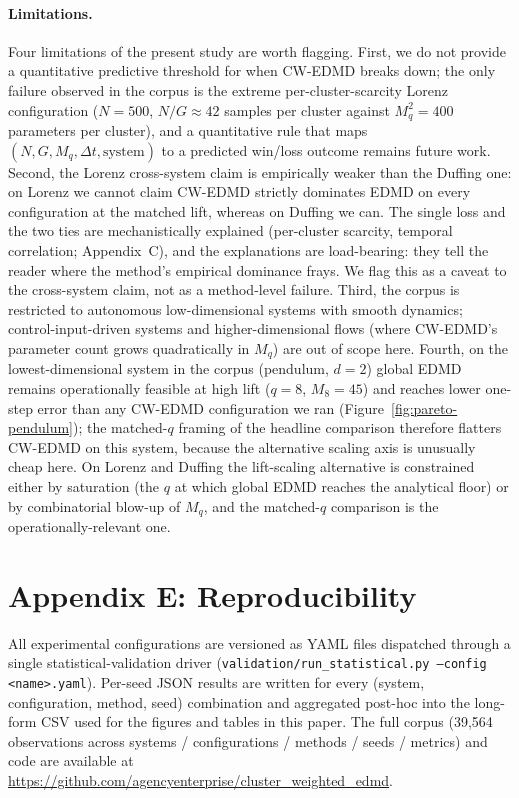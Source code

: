 \documentclass{article}
\begin{document}
\paragraph{Limitations.} Four limitations of the present study are worth flagging. First, we do not provide a quantitative predictive threshold for when CW-EDMD breaks down; the only failure observed in the corpus is the extreme per-cluster-scarcity Lorenz configuration ($N{=}500$, $N/G \approx 42$ samples per cluster against $M_q^2 = 400$ parameters per cluster), and a quantitative rule that maps $(N, G, M_q, \Delta t, \text{system})$ to a predicted win/loss outcome remains future work. Second, the Lorenz cross-system claim is empirically weaker than the Duffing one: on Lorenz we cannot claim CW-EDMD strictly dominates EDMD on every configuration at the matched lift, whereas on Duffing we can. The single loss and the two ties are mechanistically explained (per-cluster scarcity, temporal correlation; Appendix~C), and the explanations are load-bearing: they tell the reader where the method's empirical dominance frays. We flag this as a caveat to the cross-system claim, not as a method-level failure. Third, the corpus is restricted to autonomous low-dimensional systems with smooth dynamics; control-input-driven systems and higher-dimensional flows (where CW-EDMD's parameter count grows quadratically in $M_q$) are out of scope here. Fourth, on the lowest-dimensional system in the corpus (pendulum, $d{=}2$) global EDMD remains operationally feasible at high lift ($q{=}8$, $M_8 = 45$) and reaches lower one-step error than any CW-EDMD configuration we ran (Figure~\ref{fig:pareto-pendulum}); the matched-$q$ framing of the headline comparison therefore flatters CW-EDMD on this system, because the alternative scaling axis is unusually cheap here. On Lorenz and Duffing the lift-scaling alternative is constrained either by saturation (the $q$ at which global EDMD reaches the analytical floor) or by combinatorial blow-up of $M_q$, and the matched-$q$ comparison is the operationally-relevant one.

\section*{Appendix E: Reproducibility}

All experimental configurations are versioned as YAML files dispatched through a single statistical-validation driver (\texttt{validation/run\_statistical.py --config <name>.yaml}). Per-seed JSON results are written for every (system, configuration, method, seed) combination and aggregated post-hoc into the long-form CSV used for the figures and tables in this paper. The full corpus (39{,}564 observations across systems / configurations / methods / seeds / metrics) and code are available at \url{https://github.com/agencyenterprise/cluster_weighted_edmd}.
\end{document}
